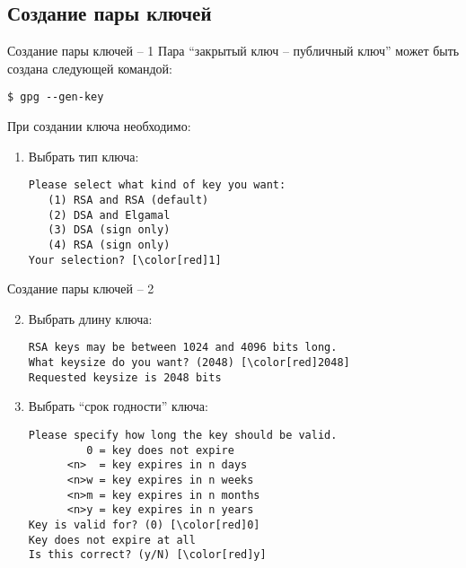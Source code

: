 \documentclass[presentation]{beamer}
\begin{document}
\subsection{Создание пары ключей}

\begin{frame}[fragile]{Создание пары ключей -- 1}
  Пара ``закрытый ключ -- публичный ключ'' может быть создана
  следующей командой:
\begin{verbatim}
$ gpg --gen-key
\end{verbatim}
  При создании ключа необходимо:
  \begin{enumerate}
  \item Выбрать тип ключа:
\begin{Verbatim}[commandchars=\\\[\]]
Please select what kind of key you want:
   (1) RSA and RSA (default)
   (2) DSA and Elgamal
   (3) DSA (sign only)
   (4) RSA (sign only)
Your selection? [\color[red]1]
\end{Verbatim}
    \end{enumerate}
\end{frame}

\begin{frame}[fragile]{Создание пары ключей -- 2}
  \begin{enumerate}
    \setcounter{enumi}{1}
  \item Выбрать длину ключа:
\begin{Verbatim}[commandchars=\\\[\]]
RSA keys may be between 1024 and 4096 bits long.
What keysize do you want? (2048) [\color[red]2048]
Requested keysize is 2048 bits
\end{Verbatim}
  \item Выбрать ``срок годности'' ключа:
\begin{Verbatim}[commandchars=\\\[\]]
Please specify how long the key should be valid.
         0 = key does not expire
      <n>  = key expires in n days
      <n>w = key expires in n weeks
      <n>m = key expires in n months
      <n>y = key expires in n years
Key is valid for? (0) [\color[red]0]
Key does not expire at all
Is this correct? (y/N) [\color[red]y]
\end{Verbatim}
    \end{enumerate}
\end{frame}
\end{document}
